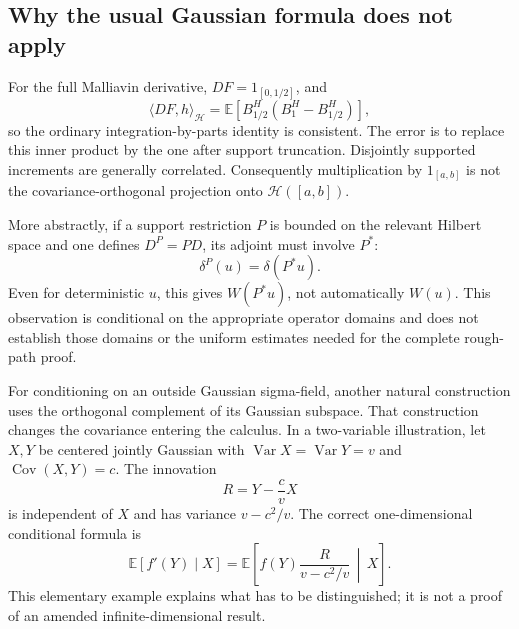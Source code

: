 \documentclass[10pt]{article}
\begin{document}
\subsection*{Why the usual Gaussian formula does not apply}
For the full Malliavin derivative, \(DF=1_{[0,1/2]}\), and \[\langle DF,h\rangle_{\mathcal H}
 =\mathbb E[B^H_{1/2}(B^H_1-B^H_{1/2})],\] so the ordinary integration-by-parts identity is consistent. The error is to replace this inner product by the one after support truncation. Disjointly supported increments are generally correlated. Consequently multiplication by \(1_{[a,b]}\) is not the covariance-orthogonal projection onto \(\mathcal H([a,b])\).\par
More abstractly, if a support restriction \(P\) is bounded on the relevant Hilbert space and one defines \(D^P=PD\), its adjoint must involve \(P^*\): \[\delta^P(u)=\delta(P^*u).\] Even for deterministic \(u\), this gives \(W(P^*u)\), not automatically \(W(u)\). This observation is conditional on the appropriate operator domains and does not establish those domains or the uniform estimates needed for the complete rough-path proof.\par
For conditioning on an outside Gaussian sigma-field, another natural construction uses the orthogonal complement of its Gaussian subspace. That construction changes the covariance entering the calculus. In a two-variable illustration, let \(X,Y\) be centered jointly Gaussian with \(\operatorname{Var}X=\operatorname{Var}Y=v\) and \(\operatorname{Cov}(X,Y)=c\). The innovation \[R=Y-\frac cvX\] is independent of \(X\) and has variance \(v-c^2/v\). The correct one-dimensional conditional formula is \[\mathbb E[f'(Y)\mid X]
 =\mathbb E\!\left[f(Y)\frac{R}{v-c^2/v}\,\middle|\,X\right].\] This elementary example explains what has to be distinguished; it is not a proof of an amended infinite-dimensional result.\par
\end{document}

